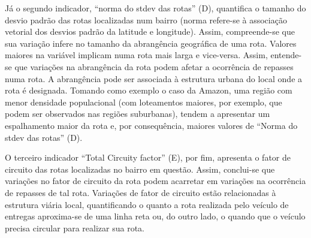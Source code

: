 Já o segundo indicador, ``norma do stdev das rotas'' (D), quantifica o tamanho do desvio padrão das rotas localizadas num bairro (norma refere-se à associação vetorial dos desvios padrão da latitude e longitude).
Assim, compreende-se que sua variação infere no tamanho da abrangência geográfica de uma rota.
Valores maiores na variável implicam numa rota mais larga e vice-versa.
Assim, entende-se que variações na abrangência da rota podem afetar a ocorrência de repasses numa rota.
A abrangência pode ser associada à estrutura urbana do local onde a rota é designada.
Tomando como exemplo o caso da Amazon, uma região com menor densidade populacional (com loteamentos maiores, por exemplo, que podem ser observados nas regiões suburbanas), tendem a apresentar um espalhamento maior da rota e, por consequência, maiores valores de ``Norma do stdev das rotas'' (D).

O terceiro indicador ``Total Circuity factor'' (E), por fim, apresenta o fator de circuito das rotas localizadas no bairro em questão.
Assim, conclui-se que variações no fator de circuito da rota podem acarretar em variações na ocorrência de repasses de tal rota.
Variações de fator de circuito estão relacionadas à estrutura viária local, quantificando o quanto a rota realizada pelo veículo de entregas aproxima-se de uma linha reta ou, do outro lado, o quando que o veículo precisa circular para realizar sua rota.

\color{black}


